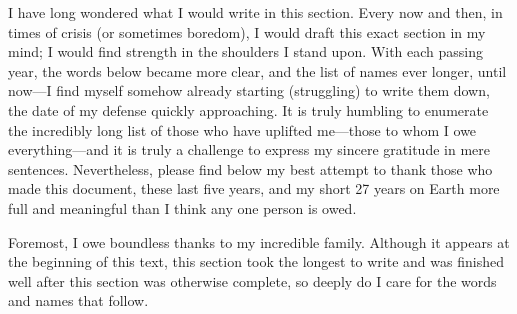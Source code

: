 \begin{acknowledgements}
I have long wondered what I would write in this section. 
Every now and then, in times of crisis (or sometimes boredom), I would draft this exact section in my mind; I would find strength in the shoulders I stand upon. 
With each passing year, the words below became more clear, and the list of names ever longer, until now---I find myself somehow already starting (struggling) to write them down, the date of my defense quickly approaching. 
It is truly humbling to enumerate the incredibly long list of those who have uplifted me---those to whom I owe everything---and it is truly a challenge to express my sincere gratitude in mere sentences. 
Nevertheless, please find below my best attempt to thank those who made this document, these last five years, and my short 27 years on Earth more full and meaningful than I think any one person is owed.

Foremost, I owe boundless thanks to my incredible family. 
Although it appears at the beginning of this text, this section took the longest to write and was finished well after this section was otherwise complete, so deeply do I care for the words and names that follow. 


\end{acknowledgements}
